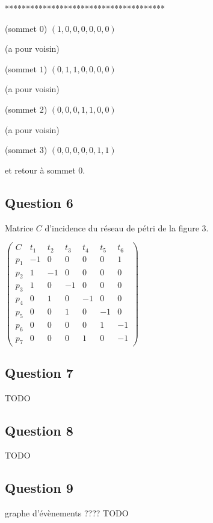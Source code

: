 **************************************

(sommet $0$) $(1, 0, 0, 0, 0, 0, 0)$

(a pour voisin)

(sommet $1$) $(0, 1, 1, 0, 0, 0, 0)$

(a pour voisin)

(sommet $2$) $(0, 0, 0, 1, 1, 0, 0)$

(a pour voisin)

(sommet $3$) $(0, 0, 0, 0, 0, 1, 1)$

et retour à sommet $0$.

\subsection{Question 6}
Matrice $C$ d'incidence du réseau de pétri de la figure $3$.

 $ \begin{pmatrix}
C&t_1&t_2&t_3&t_4&t_5&t_6 \\
p_1& -1&0&0&0&0&1 \\
p_2&1&-1&0&0&0&0 \\
p_3&1&0&-1&0&0&0 \\
p_4&0&1&0&-1&0&0 \\
p_5&0&0&1&0&-1&0 \\
p_6&0&0&0&0&1&-1 \\
p_7&0&0&0&1&0&-1 
\end{pmatrix}$

\subsection{Question 7}
TODO
\subsection{Question 8}
TODO
\subsection{Question 9}
graphe d'évènements ????
TODO
